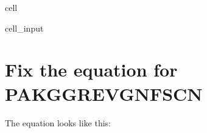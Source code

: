 \documentclass[letterpaper,10pt,english]{jupyterBook}
\begin{document}
\begin{sphinxuseclass}{cell}\begin{sphinxVerbatimInput}

\begin{sphinxuseclass}{cell_input}
\begin{sphinxVerbatim}[commandchars=\\\{\}]
   
\end{sphinxVerbatim}

\end{sphinxuseclass}\end{sphinxVerbatimInput}

\end{sphinxuseclass}

\section{Fix the equation for PAKGGREVGNFSCN}
\label{\detokenize{content/howto/experiments/Standard experiment simple:fix-the-equation-for-pakggrevgnfscn}}
\sphinxAtStartPar
The equation looks like this:
\end{document}
